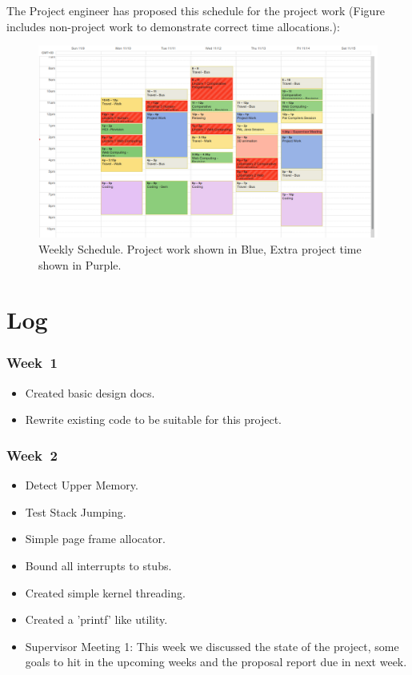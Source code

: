 \documentclass[a4paper]{report}
\begin{document}
The Project engineer has proposed this schedule for the project work (Figure includes non-project work to demonstrate correct time allocations.):


\begin{figure}[ht]
\centering
\includegraphics[width=450px]{images/schedule_screenshot}
\caption{Weekly Schedule. Project work shown in Blue, Extra project time shown in Purple.}
\label{fig:schedulerscreen}
\end{figure}


\chapter*{Log}


\subsection*{Week 1}
\begin{itemize}
\item Created basic design docs.
\item Rewrite existing code to be suitable for this project.
\end{itemize}

\subsection*{Week 2}
\begin{itemize}
\item Detect Upper Memory.
\item Test Stack Jumping.
\item Simple page frame allocator.
\item Bound all interrupts to stubs.
\item Created simple kernel threading.
\item Created a 'printf' like utility.
\item Supervisor Meeting 1: This week we discussed the state of the project, some goals to hit in the upcoming weeks and the proposal report due in next week.
\end{itemize}
\end{document}
